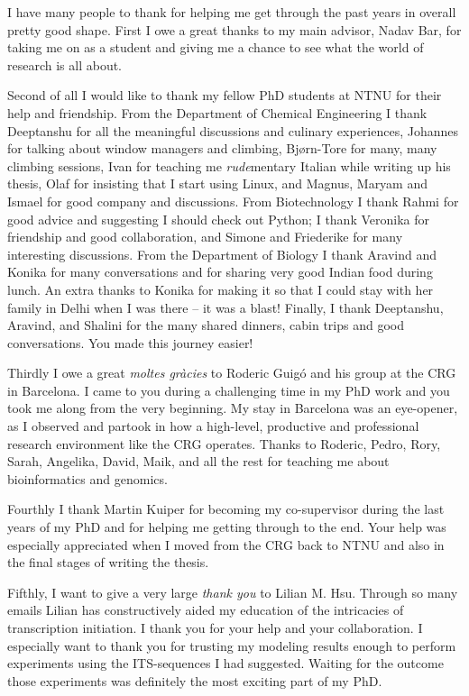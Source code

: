 I have many people to thank for helping me get through the past years in
overall pretty good shape. First I owe a great thanks to my main advisor, Nadav
Bar, for taking me on as a student and giving me a chance to see what the world
of research is all about.

Second of all I would like to thank my fellow PhD students at NTNU for their
help and friendship. From the Department of Chemical Engineering I thank
Deeptanshu for all the meaningful discussions and culinary experiences,
Johannes for talking about window managers and climbing, Bjørn-Tore for many,
many climbing sessions, Ivan for teaching me \textit{rude}mentary Italian while
writing up his thesis, Olaf for insisting that I start using Linux, and Magnus,
Maryam and Ismael for good company and discussions. From Biotechnology I thank
Rahmi for good advice and suggesting I should check out Python; I thank
Veronika for friendship and good collaboration, and Simone and Friederike
for many interesting discussions. From the Department of Biology I thank Aravind and
Konika for many conversations and for sharing very good Indian food during
lunch. An extra thanks to Konika for making it so that I could stay with her
family in Delhi when I was there -- it was a blast! Finally, I thank
Deeptanshu, Aravind, and Shalini for the many shared dinners, cabin trips and
good conversations. You made this journey easier!

Thirdly I owe a great \textit{moltes gràcies} to Roderic Guigó and his group at
the CRG in Barcelona. I came to you during a challenging time in my PhD work
and you took me along from the very beginning. My stay in Barcelona was an
eye-opener, as I observed and partook in how a high-level, productive and
professional research environment like the CRG operates. Thanks to Roderic,
Pedro, Rory, Sarah, Angelika, David, Maik, and all the rest for teaching me
about bioinformatics and genomics.

Fourthly I thank Martin Kuiper for becoming my co-supervisor during the last
years of my PhD and for helping me getting through to the end. Your help was
especially appreciated when I moved from the CRG back to NTNU and also in the
final stages of writing the thesis.

Fifthly, I want to give a very large \textit{thank you} to Lilian M. Hsu.
Through so many emails Lilian has constructively aided my education of the
intricacies of transcription initiation. I thank you for your help and your
collaboration. I especially want to thank you for trusting my modeling results
enough to perform experiments using the ITS-sequences I had suggested. Waiting
for the outcome those experiments was definitely the most exciting part of my
PhD.

